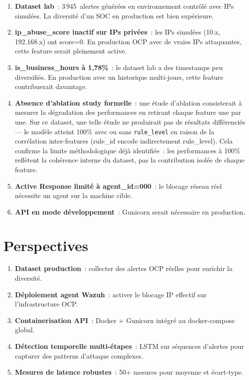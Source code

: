\documentclass[12pt,a4paper]{report}
\begin{document}
\begin{enumerate}
  \item \textbf{Dataset lab}~: 3\,945~alertes générées en environnement contrôlé avec IPs simulées. La diversité d'un SOC en production est bien supérieure.
  \item \textbf{ip\_abuse\_score inactif sur IPs privées}~: les IPs simulées (10.x, 192.168.x) ont score=0. En production OCP avec de vraies IPs attaquantes, cette feature serait pleinement active.
  \item \textbf{is\_business\_hours à 1,78\%}~: le dataset lab a des timestamps peu diversifiés. En production avec un historique multi-jours, cette feature contribuerait davantage.
  \item \textbf{Absence d'ablation study formelle}~: une étude d'ablation consisterait à mesurer la dégradation des performances en retirant chaque feature une par une. Sur ce dataset, une telle étude ne produirait pas de résultats différenciés — le modèle atteint 100\% avec ou sans \texttt{rule\_level} en raison de la corrélation inter-features (rule\_id encode indirectement rule\_level). Cela confirme la limite méthodologique déjà identifiée~: les performances à 100\% reflètent la cohérence interne du dataset, pas la contribution isolée de chaque feature.
  \item \textbf{Active Response limité à agent\_id=000}~: le blocage réseau réel nécessite un agent sur la machine cible.
  \item \textbf{API en mode développement}~: Gunicorn serait nécessaire en production.
\end{enumerate}

\needspace{6cm}
\section{Perspectives}

\begin{enumerate}
  \item \textbf{Dataset production}~: collecter des alertes OCP réelles pour enrichir la diversité.
  \item \textbf{Déploiement agent Wazuh}~: activer le blocage IP effectif sur l'infrastructure OCP.
  \item \textbf{Containerisation API}~: Docker + Gunicorn intégré au docker-compose global.
  \item \textbf{Détection temporelle multi-étapes}~: LSTM sur séquences d'alertes pour capturer des patterns d'attaque complexes.
  \item \textbf{Mesures de latence robustes}~: 50+ mesures pour moyenne et écart-type.
\end{enumerate}
\end{document}
